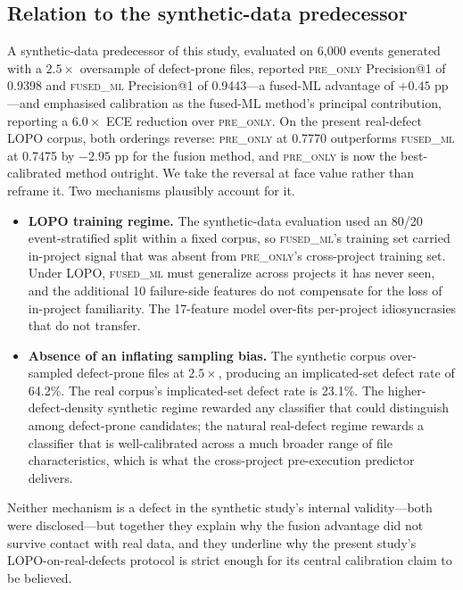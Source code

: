 \documentclass[preprint,12pt]{elsarticle}
\begin{document}
\subsection{Relation to the synthetic-data predecessor}

A synthetic-data predecessor of this study, evaluated on 6{,}000 events generated with a $2.5\times$ oversample of defect-prone files, reported \textsc{pre\_only} Precision@1 of 0.9398 and \textsc{fused\_ml} Precision@1 of 0.9443---a fused-ML advantage of $+0.45$ pp---and emphasised calibration as the fused-ML method's principal contribution, reporting a $6.0\times$ ECE reduction over \textsc{pre\_only}. On the present real-defect LOPO corpus, both orderings reverse: \textsc{pre\_only} at 0.7770 outperforms \textsc{fused\_ml} at 0.7475 by $-2.95$ pp for the fusion method, and \textsc{pre\_only} is now the best-calibrated method outright. We take the reversal at face value rather than reframe it. Two mechanisms plausibly account for it.
\begin{itemize}
\item \textbf{LOPO training regime.} The synthetic-data evaluation used an 80/20 event-stratified split within a fixed corpus, so \textsc{fused\_ml}'s training set carried in-project signal that was absent from \textsc{pre\_only}'s cross-project training set. Under LOPO, \textsc{fused\_ml} must generalize across projects it has never seen, and the additional 10 failure-side features do not compensate for the loss of in-project familiarity. The 17-feature model over-fits per-project idiosyncrasies that do not transfer.
\item \textbf{Absence of an inflating sampling bias.} The synthetic corpus over-sampled defect-prone files at $2.5\times$, producing an implicated-set defect rate of 64.2\%. The real corpus's implicated-set defect rate is 23.1\%. The higher-defect-density synthetic regime rewarded any classifier that could distinguish among defect-prone candidates; the natural real-defect regime rewards a classifier that is well-calibrated across a much broader range of file characteristics, which is what the cross-project pre-execution predictor delivers.
\end{itemize}
Neither mechanism is a defect in the synthetic study's internal validity---both were disclosed---but together they explain why the fusion advantage did not survive contact with real data, and they underline why the present study's LOPO-on-real-defects protocol is strict enough for its central calibration claim to be believed.
\end{document}

